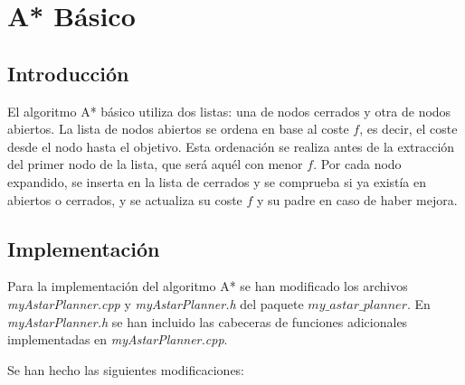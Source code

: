 \documentclass[11pt,spanish]{article} %
\begin{document}

\section{A* Básico}

\subsection{Introducción}

El algoritmo A* básico utiliza dos listas: una de nodos cerrados y otra de nodos abiertos. La lista de nodos abiertos se ordena en base al coste $f$, es decir, el coste desde el nodo hasta el objetivo. Esta ordenación se realiza antes de la extracción del primer nodo de la lista, que será aquél con menor $f$. Por cada nodo expandido, se inserta en la lista de cerrados y se comprueba si ya existía en abiertos o cerrados, y se actualiza su coste $f$ y su padre en caso de haber mejora.

\subsection{Implementación}

Para la implementación del algoritmo A* se han modificado los archivos \textit{myAstarPlanner.cpp} y \textit{myAstarPlanner.h} del paquete $my\_astar\_planner$. En \textit{myAstarPlanner.h} se han incluido las cabeceras de funciones adicionales implementadas en \textit{myAstarPlanner.cpp}.

Se han hecho las siguientes modificaciones:
\end{document}
